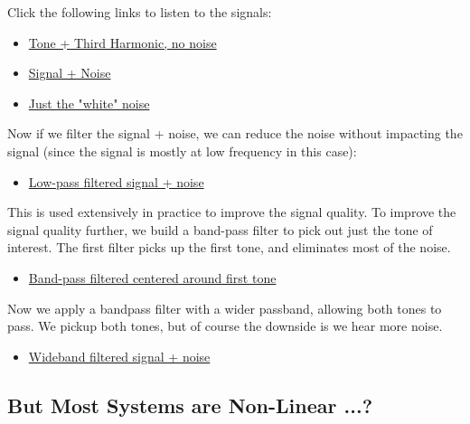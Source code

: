 Click the following links to listen to the signals:
\begin{itemize}

\item \href{http://rfic.eecs.berkeley.edu/~niknejad/photos/ee105/tones.mp3}{Tone + Third Harmonic, no noise}

\item  \href{http://rfic.eecs.berkeley.edu/~niknejad/photos/ee105/tones\_noise.mp3}{Signal + Noise}

\item \href{http://rfic.eecs.berkeley.edu/~niknejad/photos/ee105/noise.mp3}{Just the "white" noise}
\end{itemize}	

Now if we filter the signal + noise, we can reduce the noise without impacting the signal (since the signal is mostly at low frequency in this case):
	
\begin{itemize}
\item  \href{ http://rfic.eecs.berkeley.edu/~niknejad/photos/ee105/tones\_lpf.mp3}{Low-pass filtered signal + noise}
\end{itemize}
	
 This is used extensively in practice to improve the signal quality.  To improve the signal quality further, we build a band-pass filter to pick out just the tone of interest.  The first filter picks up the first tone, and eliminates most of the noise.

\begin{itemize}
\item \href{http://rfic.eecs.berkeley.edu/~niknejad/photos/ee105/tones\_bpf\_wC.mp3}{Band-pass filtered centered around first tone}
\end{itemize}
			
Now we apply a bandpass filter with a  wider passband, allowing both tones to pass.  We pickup both tones, but of course the downside is we hear more noise.

\begin{itemize}
\item  \href{http://rfic.eecs.berkeley.edu/~niknejad/photos/ee105/tones\_bpf.mp3}{Wideband filtered signal + noise} 
\end{itemize}

 



\subsection{But Most Systems are Non-Linear ...?}

